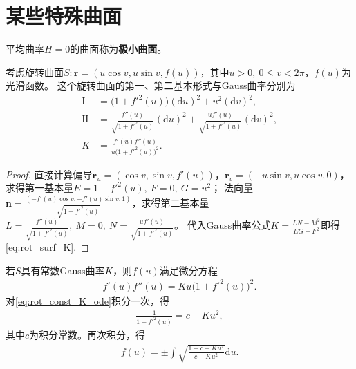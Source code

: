 \documentclass[../../main.tex]{subfiles}%
\begin{document}
\section{某些特殊曲面}

\begin{definition}
平均曲率$H=0$的曲面称为\textbf{极小曲面}。
\end{definition}

\begin{proposition}
考虑旋转曲面$S:\boldsymbol{r}=(u\cos v,u\sin v,f(u))$，其中$u>0,\ 0\leqslant v<2\pi$，$f(u)$为光滑函数。
这个旋转曲面的第一、第二基本形式与Gauss曲率分别为
\begin{align}
\mathrm{I}&=\big(1+f'^2(u)\big)(\mathrm{d}u)^2+u^2(\mathrm{d}v)^2,\label{eq:rot_surf_I}\\
\mathrm{II}&=\frac{f''(u)}{\sqrt{1+f'^2(u)}}(\mathrm{d}u)^2+\frac{uf'(u)}{\sqrt{1+f'^2(u)}}(\mathrm{d}v)^2,\label{eq:rot_surf_II}\\
K&=\frac{f'(u)f''(u)}{u\big(1+f'^2(u)\big)^2}.\label{eq:rot_surf_K}
\end{align}
\end{proposition}
\begin{proof}

直接计算偏导$\boldsymbol{r}_u=(\cos v,\sin v,f'(u))$，$\boldsymbol{r}_v=(-u\sin v,u\cos v,0)$，求得第一基本量$E=1+f'^2(u),\ F=0,\ G=u^2$；
法向量$\boldsymbol{n}=\frac{(-f'(u)\cos v,-f'(u)\sin v,1)}{\sqrt{1+f'^2(u)}}$，求得第二基本量$L=\frac{f''(u)}{\sqrt{1+f'^2(u)}},\ M=0,\ N=\frac{uf'(u)}{\sqrt{1+f'^2(u)}}$。
代入Gauss曲率公式$K=\frac{LN-M^2}{EG-F^2}$即得\eqref{eq:rot_surf_K}.

\end{proof}

若$S$具有常数Gauss曲率$K$，则$f(u)$满足微分方程
\begin{align}
f'(u)f''(u)=Ku\big(1+f'^2(u)\big)^2.\label{eq:rot_const_K_ode}
\end{align}
对\eqref{eq:rot_const_K_ode}积分一次，得
\begin{align}
\frac{1}{1+f'^2(u)}=c-Ku^2,\label{eq:rot_const_K_int1}
\end{align}
其中$c$为积分常数。再次积分，得
\begin{align}
f(u)=\pm\int\sqrt{\frac{1-c+Ku^2}{c-Ku^2}}\mathrm{d}u.\label{eq:rot_const_K_int2}
\end{align}
\end{document}
